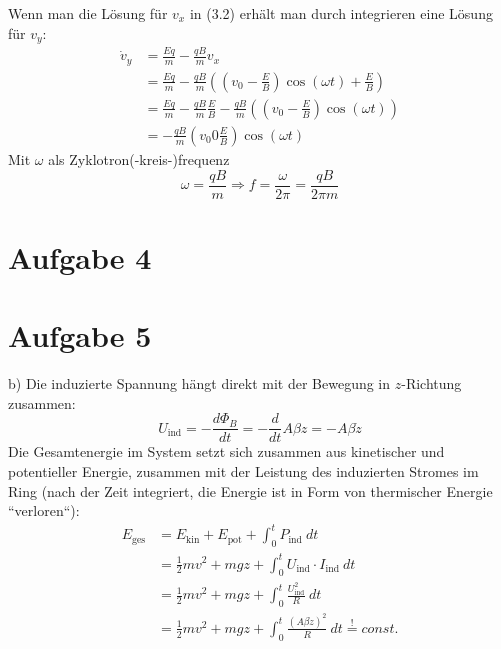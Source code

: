 \documentclass[11pt a4paper]{article}
\begin{document}
\newpage
Wenn man die Lösung für $v_x$ in (3.2) erhält man durch integrieren eine
Lösung für $v_y$:
\begin{align*}
	\dot v_y &= \frac{Eq}{m} - \frac{qB}{m} v_x \\
	&= \frac{Eq}{m} - \frac{qB}{m} \left(
		\left( v_0 - \frac EB \right) \cos(\omega t) + \frac EB
		\right) \\
	&= \frac{Eq}{m} - \frac{qB}{m} \frac EB  - \frac{qB}{m}\left(
		\left( v_0 - \frac EB \right) \cos(\omega t)
		\right) \\
	&= -\frac{qB}{m} \left(v_0 0 \frac EB \right)
		\cos (\omega t)
\end{align*}
Mit $\omega$ als Zyklotron(-kreis-)frequenz
\[ 
	\omega = \frac{qB}{m} 
	\Rightarrow f = \frac{\omega}{2\pi} = \frac{qB}{2\pi m}
\]

\newpage

\section*{Aufgabe 4}
\newpage
\section*{Aufgabe 5}

b) Die induzierte Spannung hängt direkt mit der Bewegung in $z$-Richtung 
zusammen:
\[
	U_\text{ind} = -\frac{d\Phi_B}{dt}
	= -\frac{d}{dt} A \beta z
	= -A\beta \dot z
\]
Die Gesamtenergie im System setzt sich zusammen aus kinetischer und
potentieller Energie, zusammen mit der Leistung des induzierten Stromes
im Ring (nach der Zeit integriert, die Energie ist in Form von 
thermischer Energie ``verloren``):
\begin{align*}
	E_\text{ges} 
	&= E_\text{kin} + E_\text{pot} + \int_0^t P_\text{ind} \ dt \\
	&= \frac12 mv^2 + mgz 
	+ \int_0^t U_\text{ind} \cdot I_\text{ind} \ dt \\
	&= \frac12 mv^2 + mgz 
	+ \int_0^t \frac{U_\text{ind}^2} R \ dt \\
	&= \frac12 mv^2 + mgz 
	+ \int_0^t \frac{(A\beta \dot z)^2} R \ dt
	\overset != const.
\end{align*}

\vspace{0.5cm}
\end{document}

